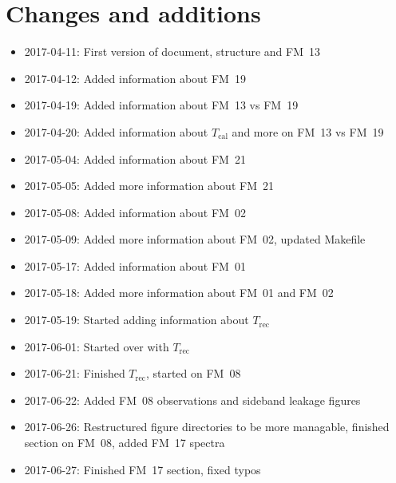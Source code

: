 \chapter{Changes and additions}
\label{ch:changes}

\begin{itemize}
    \item 2017-04-11: First version of document, structure and FM~13
    \item 2017-04-12: Added information about FM~19
    \item 2017-04-19: Added information about FM~13 vs FM~19
    \item 2017-04-20: Added information about $T_\mathrm{cal}$
                      and more on FM~13 vs FM~19
    \item 2017-05-04: Added information about FM~21
    \item 2017-05-05: Added more information about FM~21
    \item 2017-05-08: Added information about FM~02
    \item 2017-05-09: Added more information about FM~02, updated Makefile
    \item 2017-05-17: Added information about FM~01
    \item 2017-05-18: Added more information about FM~01 and FM~02
    \item 2017-05-19: Started adding information about $T_\mathrm{rec}$
    \item 2017-06-01: Started over with $T_\mathrm{rec}$
    \item 2017-06-21: Finished $T_\mathrm{rec}$, started on FM~08
    \item 2017-06-22: Added FM~08 observations and sideband leakage figures
    \item 2017-06-26: Restructured figure directories to be more managable,
                      finished section on FM~08, added FM~17 spectra
    \item 2017-06-27: Finished FM~17 section, fixed typos
\end{itemize}
